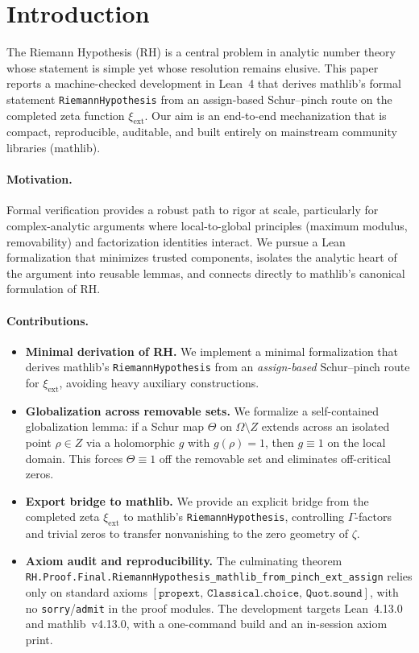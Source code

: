 \documentclass[11pt]{article}
\theoremstyle{plain}
\theoremstyle{definition}
\begin{document}
\tableofcontents
\newpage

\section{Introduction}

The Riemann Hypothesis (RH) is a central problem in analytic number theory whose statement is simple yet whose resolution remains elusive. This paper reports a machine-checked development in Lean~4 that derives mathlib's formal statement \texttt{RiemannHypothesis} from an assign-based Schur--pinch route on the completed zeta function \(\xi_{\mathrm{ext}}\). Our aim is an end-to-end mechanization that is compact, reproducible, auditable, and built entirely on mainstream community libraries (mathlib).

\paragraph{Motivation.}
Formal verification provides a robust path to rigor at scale, particularly for complex-analytic arguments where local-to-global principles (maximum modulus, removability) and factorization identities interact. We pursue a Lean formalization that minimizes trusted components, isolates the analytic heart of the argument into reusable lemmas, and connects directly to mathlib's canonical formulation of RH.

\paragraph{Contributions.}
\begin{itemize}
  \item \textbf{Minimal derivation of RH.} We implement a minimal formalization that derives mathlib's \texttt{RiemannHypothesis} from an \emph{assign-based} Schur--pinch route for \(\xi_{\mathrm{ext}}\), avoiding heavy auxiliary constructions.
  \item \textbf{Globalization across removable sets.} We formalize a self-contained globalization lemma: if a Schur map \(\Theta\) on \(\Omega \setminus Z\) extends across an isolated point \(\rho \in Z\) via a holomorphic \(g\) with \(g(\rho)=1\), then \(g\equiv 1\) on the local domain. This forces \(\Theta\equiv 1\) off the removable set and eliminates off-critical zeros.
  \item \textbf{Export bridge to mathlib.} We provide an explicit bridge from the completed zeta \(\xi_{\mathrm{ext}}\) to mathlib's \texttt{RiemannHypothesis}, controlling \(\Gamma\)-factors and trivial zeros to transfer nonvanishing to the zero geometry of \(\zeta\).
  \item \textbf{Axiom audit and reproducibility.} The culminating theorem \texttt{RH.Proof.Final.RiemannHypothesis\_mathlib\_from\_pinch\_ext\_assign} relies only on standard axioms \([\texttt{propext},\,\texttt{Classical.choice},\,\texttt{Quot.sound}]\), with no \texttt{sorry}/\texttt{admit} in the proof modules. The development targets Lean~4.13.0 and mathlib~v4.13.0, with a one-command build and an in-session axiom print.
\end{itemize}
\end{document}
